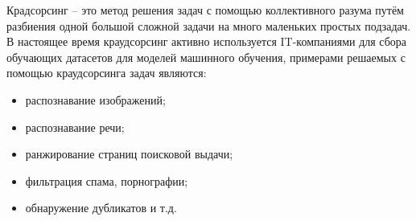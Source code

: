 \documentclass[specification,annotation,times]{itmo-student-thesis}
\begin{document}


\researchsummary{}




\tableofcontents

\startprefacepage

Крадсорсинг -- это метод решения задач с помощью коллективного разума путём разбиения одной большой сложной задачи на много маленьких простых подзадач. В настоящее время краудсорсинг активно используется IT-компаниями для сбора обучающих датасетов для моделей машинного обучения, примерами решаемых с помощью краудсорсинга задач являются:
\begin{itemize}
    \item распознавание изображений;
    \item распознавание речи;
    \item ранжирование страниц поисковой выдачи;
    \item фильтрация спама, порнографии;
    \item обнаружение дубликатов и т.д.
\end{itemize}
\end{document}
